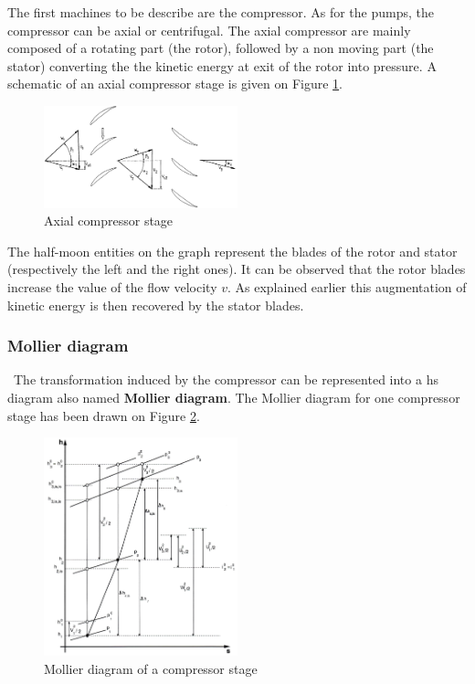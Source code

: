 The first machines to be describe are the compressor. As for the pumps, the compressor can be axial or centrifugal.  The axial compressor are mainly composed of a rotating part (the rotor), followed by a non moving part (the stator) converting the the kinetic energy at exit of the rotor into pressure. A schematic of an axial compressor stage is given on Figure \ref{fig:C3_compstage}.

\begin{figure}[h]
    \centering
    \includegraphics[width=0.5\textwidth]{Comp_stage.png}
    \caption{Axial compressor stage \cite{Hillewaert2019}}
    \label{fig:C3_compstage}
\end{figure}

The half-moon entities on the graph represent the blades of the rotor and stator (respectively the left and the right ones). It can be observed that the rotor blades increase the value of the flow velocity \(v\). As explained earlier this augmentation of kinetic energy is then recovered by the stator blades.

\subsubsection{Mollier diagram}
\quad\ The transformation induced by the compressor can be represented into a hs diagram also named \textbf{Mollier diagram}. The Mollier diagram for one compressor stage has been drawn on Figure \ref{fig:C3_Molliercomp}.

\begin{figure}[h]
    \centering
    \includegraphics[width=0.5\textwidth]{Comp_mollier.png}
    \caption{Mollier diagram of a compressor stage \cite{Hillewaert2019}}
    \label{fig:C3_Molliercomp}
\end{figure}

